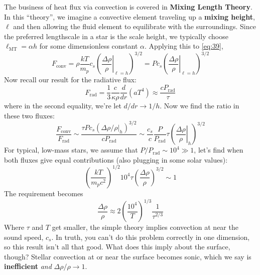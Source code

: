 \documentclass[10pt]{article}
\numberwithin{equation}{section}
\newcommand{\n}{\noindent}
\begin{document}
  \n The business of heat flux via convection is covered in
  \textbf{Mixing Length Theory}. In this ``theory'', we imagine a
  convective element traveling up a \textbf{mixing height}, $\ell$ and
  then allowing the fluid element to equilibrate with the
  surroundings. Since the preferred lengthscale in a star is the scale
  height, we typically choose $\ell_{\mathrm{MT}}=\alpha h$ for some
  dimensionless constant $\alpha$. Applying this to \eqref{eq:39},
  \begin{equation}
    \label{eq:40}
    F_{\mathrm{conv}}=\rho\frac{kT}{m_p}c_s\left(\left.\frac{\Delta\rho}{\rho}\right|_{\ell=h}\right)^{3/2}=Pc_s\left(\left.\frac{\Delta\rho}{\rho}\right|_{\ell=h}\right)^{3/2}
  \end{equation}
  Now recall our result for the radiative flux:
  \begin{equation}
    \label{eq:41}
    F_{\mathrm{rad}}=\frac{1}{3}\frac{c}{\kappa\rho}\frac{d}{dr}\left(aT^4\right)\approx \frac{cP_{\mathrm{rad}}}{\tau}
  \end{equation}
  where in the second equality, we're let $d/dr\to 1/h$. Now we find
  the ratio in these two fluxes:
  \begin{equation}
    \label{eq:42}
    \frac{F_{\mathrm{conv}}}{F_{\mathrm{rad}}}\sim \frac{\tau Pc_s\left(\left.\Delta\rho/\rho\right|_h\right)^{3/2}}{cP_{\mathrm{rad}}}\sim\frac{c_s}{c}\frac{P}{P_{\mathrm{rad}}}\tau\left(\left.\frac{\Delta\rho}{\rho}\right|_h\right)^{3/2}
  \end{equation}
  For typical, low-mass stars, we assume that $P/P_{\mathrm{rad}}\sim 10^4\gg
  1$, let's find when both fluxes give equal contributions (also
  plugging in some solar values):
  \begin{equation}
    \label{eq:43}
    \left(\frac{kT}{m_pc^2}\right)^{1/2}10^4\tau\left(\frac{\Delta\rho}{\rho}\right)^{3/2}\sim 1
  \end{equation}
  The requirement becomes
  \begin{equation}
    \label{eq:44}
    \frac{\Delta\rho}{\rho}\approx 2\left(\frac{10^4}{T}\right)^{1/3}\frac{1}{\tau^{2/3}}
  \end{equation}
  Where $\tau$ and $T$ get smaller, the simple theory implies
  convection at near the sound speed, $c_s$. In truth, you can't do
  this problem correctly in one dimension, so this result isn't all
  that good. What does this imply about the surface, though? Stellar
  convection at or near the surface becomes sonic, which we say is
  \textbf{inefficient} \emph{and} $\Delta\rho/\rho\to 1$.\\
\end{document}
